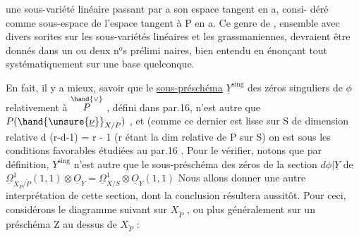 
une sous-variété linéaire passant par a son espace tangent en a, consi-%
déré comme sous-espace  de l'espace tangent à P en a. Ce genre
\margin{\hand{|}}de , ensemble avec divers sorites sur les sous-variétés linéaires
et les grassmaniennes, devraient être donnés dans un ou deux n$^{\text{o}}$s prélimi
naires, bien entendu en énonçant tout systématiquement sur une base
quelconque.

En fait, il y a mieux, savoir que le \uline{sous-préschéma} $\underline{Y}^{\mathrm{sing}}$
des zéros singuliers de $\phi$ relativement à $\overset{\hand{\vee}}{P}$ , défini dans par.16, n'est
autre que $P(\hand{\unsure{\underline{\nu}}}_{X/P})$ , et (comme ce dernier est lisse sur S de dimension
relative d \unsure{$+$} (r-d-1) = r - 1 (r étant la dim relative de P sur S)
on est sous les conditions favorables étudiées au par.16 .  Pour le vérifier,
notons que par définition, $\underline{Y}^{\mathrm{sing}}$ n'est autre que le sous-préschéma 
des zéros de la section \inserted{$\psi =$} $d\phi|\underline{Y}$ de $\underline{\Omega}^1_{X_{\check{P}}/\check{P}}(1,1)\otimes \underline{O}_Y = \underline{\Omega}^1_{X/S}\otimes\underline{O}_Y(1,1)$
Nous allons donner une autre interprétation de cette section, dont
la conclusion résultera aussitôt. Pour ceci, considérons le diagramme
 
suivant sur $X_{\check{P}}$ , ou plus généralement sur un préschéma Z  au dessus de
$X_{\check{P}}$ :

